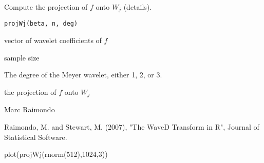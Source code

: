 \begin{Description}\relax
Compute the projection of $f$ onto $W_j$ (details).
\end{Description}
\begin{Usage}
\begin{verbatim}
projWj(beta, n, deg)
\end{verbatim}
\end{Usage}
\begin{Arguments}
\begin{ldescription}
\item[\code{beta}] vector of wavelet coefficients of $f$
\item[\code{n}] sample size
\item[\code{deg}] The degree of the Meyer wavelet, either 1, 2, or 3.
\end{ldescription}
\end{Arguments}
\begin{Value}
the projection of $f$ onto $W_j$
\end{Value}
\begin{Author}\relax
Marc Raimondo
\end{Author}
\begin{References}\relax
Raimondo, M. and Stewart, M. (2007),
"The WaveD Transform in R", Journal of Statistical Software.
\end{References}
\begin{SeeAlso}\relax
{}
\end{SeeAlso}
\begin{Examples}
\begin{ExampleCode}
 plot(projWj(rnorm(512),1024,3))
\end{ExampleCode}
\end{Examples}

